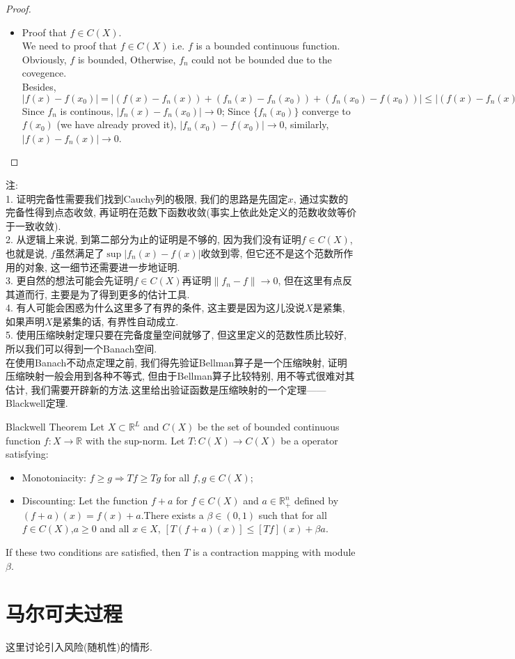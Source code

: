 \begin{proof}
\begin{itemize}
        \item Proof that $f\in C(X)$.\\
        We need to proof that $f\in C(X)$ i.e. $f$ is a bounded continuous function.\\
        Obviously, $f$ is bounded, Otherwise, $f_n$ could not be bounded due to  the covegence.\\
        Besides, $|f(x)-f(x_0)|=|(f(x)-f_n(x))+(f_n(x)-f_n(x_0))+(f_n(x_0)-f(x_0))|\leq |(f(x)-f_n(x))|+|(f_n(x)-f_n(x_0))|+|(f_n(x_0)-f(x_0))|$\\
        Since $f_n$ is continous, $|f_n(x)-f_n(x_0)|\to 0$; Since $\{f_n(x_0)\}$ converge to $f(x_0)$ (we have already proved it), $|f_n(x_0)-f(x_0)|\to 0$, similarly, $|f(x)-f_n(x)|\to 0$.

    \end{itemize}
\end{proof}
\noindent 注:\\
1. 证明完备性需要我们找到Cauchy列的极限, 我们的思路是先固定$x$, 通过实数的完备性得到点态收敛, 再证明在范数下函数收敛(事实上依此处定义的范数收敛等价于一致收敛).\\
2. 从逻辑上来说, 到第二部分为止的证明是不够的, 因为我们没有证明$f\in C(X)$, 也就是说, $f$虽然满足了$\sup |f_n(x)-f(x)|$收敛到零, 但它还不是这个范数所作用的对象, 这一细节还需要进一步地证明.\\
3. 更自然的想法可能会先证明$f\in C(X)$再证明$\|f_n-f\|\to 0 $, 但在这里有点反其道而行, 主要是为了得到更多的估计工具.\\
4. 有人可能会困惑为什么这里多了有界的条件, 这主要是因为这儿没说$X$是紧集, 如果声明$X$是紧集的话, 有界性自动成立.\\
5. 使用压缩映射定理只要在完备度量空间就够了, 但这里定义的范数性质比较好, 所以我们可以得到一个Banach空间.\\

在使用Banach不动点定理之前, 我们得先验证Bellman算子是一个压缩映射, 证明压缩映射一般会用到各种不等式, 但由于Bellman算子比较特别, 用不等式很难对其估计, 我们需要开辟新的方法.这里给出验证函数是压缩映射的一个定理——Blackwell定理.
\begin{theorem}{Blackwell Theorem}
    Let $X\subset\mathbb{R}^L$ and $C(X)$ be the set of bounded continuous function $f:X\to\mathbb{R}$ with the sup-norm.
    Let $T:C(X)\to C(X)$ be a operator satisfying:
    \begin{itemize}
        \item Monotoniacity: $f\geq g\Rightarrow Tf\geq Tg$ for all $f,g\in C(X)$;
        \item Discounting: Let the function $f+a$ for $f\in C(X)$ and $a\in\mathbb{R}^n_+$ defined by $(f+a)(x)=f(x)+a$.There exists a $\beta\in(0,1)$ such that for all $f\in C(X)$,$a\geq 0$ and all $x\in X$, $[T(f+a)(x)]\leq [Tf](x)+\beta a$.
    \end{itemize}
   If these two conditions are satisfied, then $T$ is a contraction mapping with module $\beta$.
\end{theorem}

\section{马尔可夫过程}
这里讨论引入风险(随机性)的情形.